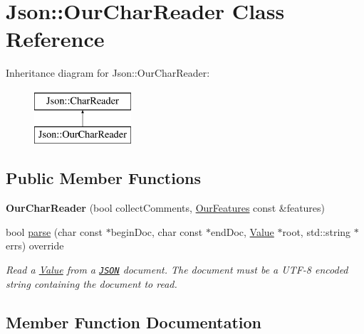 \hypertarget{class_json_1_1_our_char_reader}{}\section{Json\+:\+:Our\+Char\+Reader Class Reference}
\label{class_json_1_1_our_char_reader}
Inheritance diagram for Json\+:\+:Our\+Char\+Reader\+:\begin{figure}[H]
\begin{center}
\leavevmode
\includegraphics[height=2.000000cm]{class_json_1_1_our_char_reader}
\end{center}
\end{figure}
\subsection*{Public Member Functions}
\begin{DoxyCompactItemize}
\item 
\mbox{\label{class_json_1_1_our_char_reader_a5015506620e7ba7bab417756fa1ca9fe}} 
{\bfseries Our\+Char\+Reader} (bool collect\+Comments, \hyperlink{class_json_1_1_our_features}{Our\+Features} const \&features)
\item 
bool \hyperlink{class_json_1_1_our_char_reader_a52a1fb5fee88d9b63dd462f63b1c9570}{parse} (char const $\ast$begin\+Doc, char const $\ast$end\+Doc, \hyperlink{class_json_1_1_value}{Value} $\ast$root, std\+::string $\ast$errs) override
\begin{DoxyCompactList}\small\item\em Read a \hyperlink{class_json_1_1_value}{Value} from a \href{http://www.json.org}{\tt J\+S\+ON} document. The document must be a U\+T\+F-\/8 encoded string containing the document to read. \end{DoxyCompactList}\end{DoxyCompactItemize}


\subsection{Member Function Documentation}
\mbox{\label{class_json_1_1_our_char_reader_a52a1fb5fee88d9b63dd462f63b1c9570}} 
